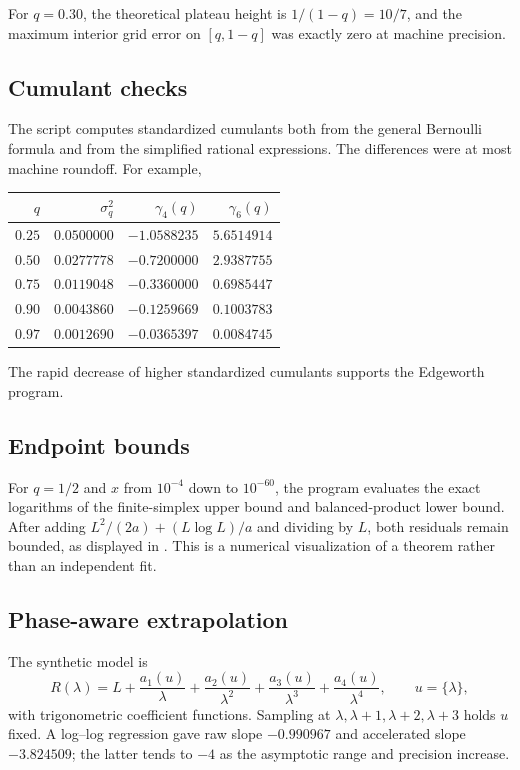\documentclass[11pt,oneside]{article}
\theoremstyle{definition}
\theoremstyle{remark}
\begin{document}
For $q=0.30$, the theoretical plateau height is $1/(1-q)=10/7$, and the maximum interior
grid error on $[q,1-q]$ was exactly zero at machine precision.

\subsection{Cumulant checks}

The script computes standardized cumulants both from the general Bernoulli formula and from
the simplified rational expressions.  The differences were at most machine roundoff.  For
example,
\begin{center}
\begin{tabular}{@{}rrrr@{}}
\toprule
$q$ & $\sigma_q^2$ & $\gamma_4(q)$ & $\gamma_6(q)$\\
\midrule
$0.25$ & $0.0500000$ & $-1.0588235$ & $5.6514914$\\
$0.50$ & $0.0277778$ & $-0.7200000$ & $2.9387755$\\
$0.75$ & $0.0119048$ & $-0.3360000$ & $0.6985447$\\
$0.90$ & $0.0043860$ & $-0.1259669$ & $0.1003783$\\
$0.97$ & $0.0012690$ & $-0.0365397$ & $0.0084745$\\
\bottomrule
\end{tabular}
\end{center}
The rapid decrease of higher standardized cumulants supports the Edgeworth program.

\subsection{Endpoint bounds}

For $q=1/2$ and $x$ from $10^{-4}$ down to $10^{-60}$, the program evaluates the exact
logarithms of the finite-simplex upper bound and balanced-product lower bound.  After adding
$L^2/(2a)+(L\log L)/a$ and dividing by $L$, both residuals remain bounded, as displayed in
.  This is a numerical visualization of a theorem rather than an
independent fit.

\subsection{Phase-aware extrapolation}

The synthetic model is
\[
 R(\lambda)=L+\frac{a_1(u)}{\lambda}
              +\frac{a_2(u)}{\lambda^2}
              +\frac{a_3(u)}{\lambda^3}
              +\frac{a_4(u)}{\lambda^4},
 \qquad u=\{\lambda\},
\]
with trigonometric coefficient functions.  Sampling at $\lambda,\lambda+1,\lambda+2,
\lambda+3$ holds $u$ fixed.  A log--log regression gave raw slope $-0.990967$ and accelerated
slope $-3.824509$; the latter tends to $-4$ as the asymptotic range and precision increase.
\end{document}

